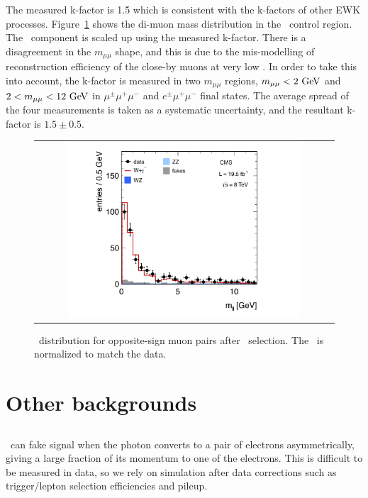 The measured k-factor is 1.5 which is consistent with the k-factors of other EWK processes. 
Figure~\ref{fig:wg3l} shows the di-muon mass distribution in the \wgammastar\ control region.
The \wgammastar\ component is scaled up using the measured k-factor. 
There is a disagreement in the $m_{\mu\mu}$ shape, and this is due to the mis-modelling 
of reconstruction efficiency of the close-by muons at very low \pt. 
In order to take this into account, the k-factor is measured in two $m_{\mu\mu}$ regions, 
$m_{\mu\mu}<2~\mathrm{Ge\kern -0.1em V}$ and $2<m_{\mu\mu}<12~\mathrm{Ge\kern -0.1em V}$ in  $\mu^\pm\mu^+\mu^-$ and $e^\pm\mu^+\mu^-$ 
final states. The average spread of the four measurements is taken as a systematic uncertainty,
and the resultant k-factor is $1.5 \pm 0.5$.

\begin{figure}[htp] 
\centering 
\begin{tabular}{c} 
\includegraphics[width=0.8\textwidth]{figures/Wg3l.pdf} 
\end{tabular} 
\caption{\mll\ distribution for opposite-sign muon pairs after \wgammastar\ selection. 
The \wgammastar\ is normalized to match the data.} 
\label{fig:wg3l} 
\end{figure} 

\section{ Other backgrounds } 

\subsection{\wgamma}

\wgamma\ can fake signal when the photon converts to a pair of electrons asymmetrically, 
giving a large fraction of its momentum to one of the electrons. 
This is difficult to be measured 
in data, so we rely on simulation after data corrections such as trigger/lepton selection 
efficiencies and pileup.

